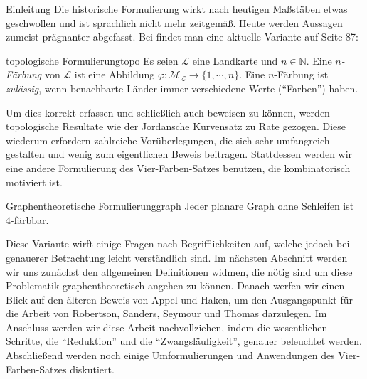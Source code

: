\begin{chapter}{Einleitung}
 Die historische Formulierung wirkt nach heutigen Maßstäben etwas geschwollen und ist sprachlich nicht mehr zeitgemäß. Heute werden Aussagen zumeist prägnanter abgefasst. Bei \cite{fritsch} findet man eine aktuelle Variante auf Seite 87:  
 
 \begin{satzl}{topologische Formulierung}{topo}
  Es seien $\mathcal{L}$ eine Landkarte und $n \in \mathbb{N}$. Eine \textit{$n$-Färbung} von $\mathcal{L}$ ist eine Abbildung $\varphi: \mathcal{M}_{\mathcal{L}} \rightarrow \{1,\cdots,n\}$. Eine $n$-Färbung ist \textit{zulässig}, wenn benachbarte Länder immer verschiedene Werte (``Farben'') haben.
 \end{satzl}

 Um dies korrekt erfassen und schließlich auch beweisen zu können, werden topologische Resultate wie der Jordansche Kurvensatz zu Rate gezogen. Diese wiederum erfordern zahlreiche Vorüberlegungen, die sich sehr umfangreich gestalten und wenig zum eigentlichen Beweis beitragen. Stattdessen werden wir eine andere Formulierung des Vier-Farben-Satzes benutzen, die kombinatorisch motiviert ist. 
 
 \begin{satzl}{Graphentheoretische Formulierung}{graph}
  Jeder planare Graph ohne Schleifen ist 4-färbbar.
 \end{satzl}
 
 Diese Variante wirft einige Fragen nach Begrifflichkeiten auf, welche jedoch bei genauerer Betrachtung leicht verständlich sind. Im nächsten Abschnitt werden wir uns zunächst den allgemeinen Definitionen widmen, die nötig sind um diese Problematik graphentheoretisch angehen zu können. Danach werfen wir einen Blick auf den älteren Beweis von Appel und Haken, um den Ausgangspunkt für die Arbeit von Robertson, Sanders, Seymour und Thomas darzulegen. Im Anschluss werden wir diese Arbeit nachvollziehen, indem die wesentlichen Schritte, die ``Reduktion'' und die ``Zwangsläufigkeit'', genauer beleuchtet werden. Abschließend werden noch einige Umformulierungen und Anwendungen des Vier-Farben-Satzes diskutiert.
\end{chapter}